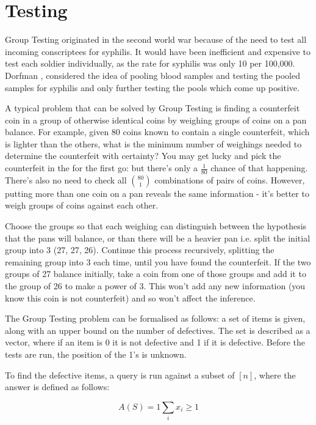 \section{Testing}
Group Testing originated in the second world war because of the need to test all incoming conscriptees for syphilis. It would have been inefficient and expensive to test each soldier individually, as the rate for syphilis was only 10 per 100,000. Dorfman \cite{Dorfman1943}, considered the idea of pooling blood samples and testing the pooled samples for syphilis and only further testing the pools which come up positive.

A typical problem that can be solved by Group Testing is finding a counterfeit coin in a group of otherwise identical coins by weighing groups of coins on a pan balance. For example, given 80 coins known to contain a single counterfeit, which is lighter than the others, what is the minimum number of weighings needed to determine the counterfeit with certainty? You may get lucky and pick the counterfeit in the for the first go: but there's only a \(\frac{1}{80}\) chance of that happening. There's also no need to check all \(80 \choose 1\) combinations of pairs of coins. However, putting more than one coin on a pan reveals the same information  - it's better to weigh groups of coins against each other.

Choose the groups so that each weighing can distinguish between the hypothesis that the pans will balance, or than there will be a heavier pan i.e. split the initial group into 3 (27, 27, 26). Continue this process recursively, splitting the remaining group into 3 each time, until you have found the counterfeit. If the two groups of 27 balance initially, take a coin from one of those groups and add it to the group of 26 to make a power of 3. This won't add any new information (you know this coin is not counterfeit) and so won't affect the inference.

The Group Testing problem can be formalised as follows: a set of items is given, along with an upper bound on the number of defectives. The set is described as a vector, where if an item is 0 it is not defective and 1 if it is defective. Before the tests are run, the position of the 1's is unknown. 

To find the defective items, a query is run against a subset of \([n]\), where the answer is defined as follows:

\begin{equation}
A\left(S\right) = 1 \sum_{i} x_i \geq 1
\end{equation}

